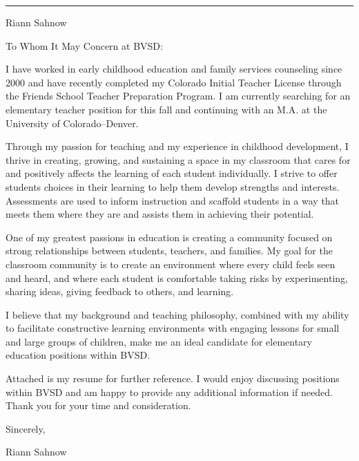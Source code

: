 \documentclass[letterpaper,10pt]{article}
\newcommand{\mblue}{\color{darkblue}}
\begin{document}
\pagestyle{empty}

{\mblue\rule{4.63in}{0.08cm}}

\vspace{-1.0pc}
\hfill{\Huge\mblue Riann Sahnow}

\vspace{2pc}
To Whom It May Concern at BVSD:

\bigbreak\qquad I have worked in early childhood
education and family services counseling since 2000 and have recently completed
my Colorado Initial Teacher License through the Friends School Teacher Preparation
Program. I am currently searching for an elementary teacher position
for this fall and continuing with an M.A. at the University of Colorado--Denver.

\bigbreak\qquad Through my passion for teaching and my experience in
childhood development, I thrive in creating, growing, and sustaining a space in
my classroom that cares for and positively affects the learning of each student
individually. I strive to offer students choices in their learning to help them
develop strengths and interests. Assessments are used to inform instruction and
scaffold students in a way that meets them where they are and assists them in
achieving their potential.

\bigbreak\qquad One of my greatest passions in education is creating
a community focused on strong relationships between students, teachers, and
families. My goal for the classroom community is to create an environment
where every child feels seen and heard, and where each student is comfortable
taking risks by experimenting, sharing ideas, giving feedback to others, and learning.

\bigbreak\qquad I believe that my background and teaching philosophy, combined
with my ability to facilitate constructive learning environments with engaging
lessons for small and large groups of children, make me an ideal candidate for
elementary education positions within BVSD.

\bigbreak\qquad Attached is my resume for further reference. I would enjoy
discussing positions within BVSD and am happy to provide any additional
information if needed. Thank you for your time and consideration.

\bigbreak Sincerely,

\vspace{2pc} Riann Sahnow
\end{document}
